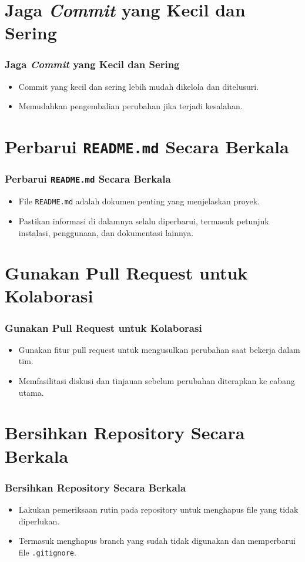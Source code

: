 \documentclass[aspectratio=169, table]{beamer}
\begin{document}
	\section{Jaga \textit{Commit} yang Kecil dan Sering}
	\begin{frame}[fragile]
		\frametitle{Jaga \textit{Commit} yang Kecil dan Sering}
		\begin{itemize}
			\item Commit yang kecil dan sering lebih mudah dikelola dan ditelusuri.
			\item Memudahkan pengembalian perubahan jika terjadi kesalahan.
		\end{itemize}
	\end{frame}
	
	\section{Perbarui \texttt{README.md} Secara Berkala}
	\begin{frame}[fragile]
		\frametitle{Perbarui \texttt{README.md} Secara Berkala}
		\begin{itemize}
			\item File \texttt{README.md} adalah dokumen penting yang menjelaskan proyek.
			\item Pastikan informasi di dalamnya selalu diperbarui, termasuk petunjuk instalasi, penggunaan, dan dokumentasi lainnya.
		\end{itemize}
	\end{frame}
	
	\section{Gunakan Pull Request untuk Kolaborasi}
	\begin{frame}[fragile]
		\frametitle{Gunakan Pull Request untuk Kolaborasi}
		\begin{itemize}
			\item Gunakan fitur pull request untuk mengusulkan perubahan saat bekerja dalam tim.
			\item Memfasilitasi diskusi dan tinjauan sebelum perubahan diterapkan ke cabang utama.
		\end{itemize}
	\end{frame}
	
	\section{Bersihkan Repository Secara Berkala}
	\begin{frame}[fragile]
		\frametitle{Bersihkan Repository Secara Berkala}
		\begin{itemize}
			\item Lakukan pemeriksaan rutin pada repository untuk menghapus file yang tidak diperlukan.
			\item Termasuk menghapus branch yang sudah tidak digunakan dan memperbarui file \texttt{.gitignore}.
		\end{itemize}
	\end{frame}
	
\end{document}
